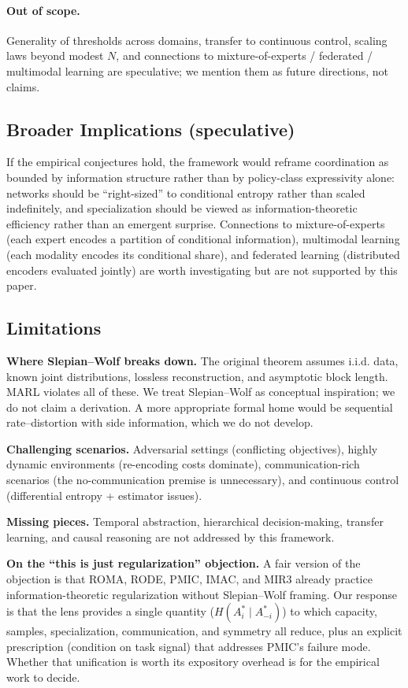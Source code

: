 \documentclass[10pt, letterpaper]{article}
\begin{document}
\paragraph{Out of scope.} Generality of thresholds across domains, transfer to continuous control, scaling laws beyond modest $N$, and connections to mixture-of-experts / federated / multimodal learning are speculative; we mention them as future directions, not claims.

\subsection{Broader Implications (speculative)}

If the empirical conjectures hold, the framework would reframe coordination as bounded by information structure rather than by policy-class expressivity alone: networks should be ``right-sized'' to conditional entropy rather than scaled indefinitely, and specialization should be viewed as information-theoretic efficiency rather than an emergent surprise. Connections to mixture-of-experts (each expert encodes a partition of conditional information), multimodal learning (each modality encodes its conditional share), and federated learning (distributed encoders evaluated jointly) are worth investigating but are not supported by this paper.

\subsection{Limitations}

\textbf{Where Slepian--Wolf breaks down.} The original theorem assumes i.i.d. data, known joint distributions, lossless reconstruction, and asymptotic block length. MARL violates all of these. We treat Slepian--Wolf as conceptual inspiration; we do not claim a derivation. A more appropriate formal home would be sequential rate--distortion with side information, which we do not develop.

\textbf{Challenging scenarios.} Adversarial settings (conflicting objectives), highly dynamic environments (re-encoding costs dominate), communication-rich scenarios (the no-communication premise is unnecessary), and continuous control (differential entropy + estimator issues).

\textbf{Missing pieces.} Temporal abstraction, hierarchical decision-making, transfer learning, and causal reasoning are not addressed by this framework.

\textbf{On the ``this is just regularization'' objection.} A fair version of the objection is that ROMA, RODE, PMIC, IMAC, and MIR3 already practice information-theoretic regularization without Slepian--Wolf framing. Our response is that the lens provides a single quantity ($H(A_i^*\mid A_{-i}^*)$) to which capacity, samples, specialization, communication, and symmetry all reduce, plus an explicit prescription (condition on task signal) that addresses PMIC's failure mode. Whether that unification is worth its expository overhead is for the empirical work to decide.
\end{document}
